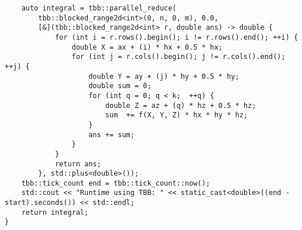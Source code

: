 \documentclass{report}
\begin{document}
\begin{lstlisting}
    auto integral = tbb::parallel_reduce(
        tbb::blocked_range2d<int>(0, n, 0, m), 0.0,
        [&](tbb::blocked_range2d<int> r, double ans) -> double {
            for (int i = r.rows().begin(); i != r.rows().end(); ++i) {
                double X = ax + (i) * hx + 0.5 * hx;
                for (int j = r.cols().begin(); j != r.cols().end(); ++j) {
                    double Y = ay + (j) * hy + 0.5 * hy;
                    double sum = 0;
                    for (int q = 0; q < k;  ++q) {
                        double Z = az + (q) * hz + 0.5 * hz;
                        sum  += f(X, Y, Z) * hx * hy * hz;
                    }
                    ans += sum;
                }
            }
            return ans;
        }, std::plus<double>());
    tbb::tick_count end = tbb::tick_count::now();
    std::cout << "Runtime using TBB: " << static_cast<double>((end - start).seconds()) << std::endl;
    return integral;
}

\end{lstlisting}
\end{document}
